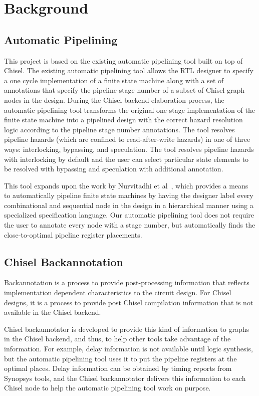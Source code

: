 \section{Background}
\subsection{Automatic Pipelining}
\label{sec:related-work}
This project is based on the existing automatic pipelining tool built on top of Chisel\cite{Bachrach:2012}. The existing automatic pipelining tool allows the RTL designer to specify a one cycle implementation of a finite state machine along with a set of annotations that specify the pipeline stage number of a subset of Chisel graph nodes in the design. During the Chisel backend elaboration process, the automatic pipelining tool transforms the original one stage implementation of the finite state machine into a pipelined design with the correct hazard resolution logic according to the pipeline stage number annotations. The tool resolves pipeline hazards (which are confined to read-after-write hazards) in one of three ways: interlocking, bypassing, and speculation. The tool resolves pipeline hazards with interlocking by default and the user can select particular state elements to be resolved with bypassing and speculation with additional annotation.

This tool expands upon the work by Nurvitadhi et al~\cite{hoe:syn}, which provides a means to automatically pipeline finite state machines by having the designer label every combinational and sequential node in the design in a hierarchical manner using a specialized specification language. Our automatic pipelining tool does not require the user to annotate every node with a stage number, but automatically finds the close-to-optimal pipeline register placements.

\subsection{Chisel Backannotation}
Backannotation is a process to provide post-processing information that reflects implementation dependent characteristics to the circuit design. For Chisel designs, it is a process to provide post Chisel compilation information that is not available in the Chisel backend.

Chisel backannotator is developed to provide this kind of information to graphs in the Chisel backend, and thus, to help other tools take advantage of the information. For example, delay information is not available until logic synthesis, but the automatic pipelining tool uses it to put the pipeline registers at the optimal places. Delay information can be obtained by timing reports from Synopsys tools, and the Chisel backannotator delivers this information to each Chisel node to help the automatic pipelining tool work on purpose.

